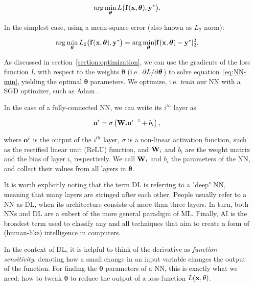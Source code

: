 $$\arg\min_{\boldsymbol\theta} L\big(\vb{f}(\vb{x}, \boldsymbol\theta), \vb{y}^*
    \big).$$

In the simplest case, using a mean-square error (also known as $L_2$
norm):

\begin{equation}\label{eq:NN-min}
    \arg\min_{\boldsymbol\theta} 
        L_2\big(\vb{f}(\vb{x}, \boldsymbol\theta), \vb{y}^* \big) 
    = \arg\min_{\boldsymbol\theta} 
        \lvert \vb{f}(\vb{x}, \boldsymbol\theta) - \vb{y}^* \rvert_2^2.
\end{equation}

As discussed in section~\ref{section:optimization}, we can use the
gradients of the loss function $L$ with respect to the weights
$\boldsymbol{\theta}$ (i.e. $\pdv*{L}{\boldsymbol\theta}$) to solve
equation~\eqref{eq:NN-min}, yielding the optimal $\boldsymbol{\theta}$
parameters. We optimize, i.e. \textit{train} our \ac{NN} with a \acf{SGD}
optimizer, such as Adam \cite{adam}.

In the case of a fully-connected \ac{NN}, we can write its $i^{th}$ layer as 

\begin{equation}\label{nn-single-layer-math}
    \vb{o}^i = \sigma\left(\vb{W}_i \vb{o}^{i-1} + b_i\right),
\end{equation}

where $\vb{o}^i$ is the output of the $i^{th}$ layer, $\sigma$ is a non-linear
activation function, such as the rectified linear unit (ReLU) function, and
$\vb{W}_i$ and $b_i$ are the weight matrix and the bias of layer $i$,
respectively. We call $\vb{W}_i$ and $b_i$ the parameters of the \ac{NN},
and collect their values from all layers in $\boldsymbol\theta$.

It is worth explicitly noting that the term \acf{DL} is referring to a "deep"
\acf{NN}, meaning that many layers are stringed after each other. People usually
refer to a \ac{NN} as \ac{DL}, when its architecture consists of more than three
layers. In turn, both \acp{NN} and \ac{DL} are a subset of the more general
paradigm of \acf{ML}. Finally, \acf{AI} is the broadest term used to classify
any and all techniques that aim to create a form of (human-like) intelligence in
computers.

In the context of \ac{DL}, it is helpful to think of the derivative as
\textit{function sensitivity}, denoting how a small change in an input variable
changes the output of the function.  For finding the $\boldsymbol\theta$
parameters of a \ac{NN}, this is exactly what we need: how to tweak
$\boldsymbol{\theta}$ to reduce the output of a loss function
$L(\vb{x},\vb{\theta})$.


